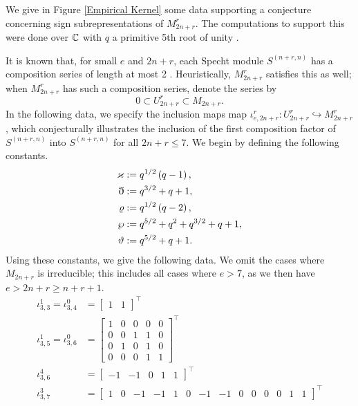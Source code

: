\documentclass{amsart}
\begin{document}
We give in Figure \ref{Empirical Kernel} some data supporting a conjecture concerning sign subrepresentations of $M_{2n + r}^r$.
The computations to support this were done over $\mathbb{C}$ with $q$ a primitive 5th root of unity \cite{Github}.

It is known that, for small $e$ and $2n + r$, each Specht module $S^{(n+r,n)}$ has a composition series of length at most 2 \cite[Appendix B]{Mathas-book}.
Heuristically, $M_{2n + r}^r$ satisfies this as well;
when $M_{2n + r}^r$ has such a composition series, denote the series by
\begin{equation}\label{U composition series}
  0 \subset U_{2n + r}^r \subset M_{2n + r}.
\end{equation}
In the following data, we specify the inclusion maps map $\iota_{e,2n+r}^r:U_{2n + r}^r \hookrightarrow M_{2n + r}^r $, which conjecturally illustrates the inclusion of the first composition factor of $S^{(n+r,n)}$ into $S^{(n+r,n)}$ for all $2n + r \leq 7$.
We begin by defining the following constants.
\def\qqo{\varkappa}
\def\tto{\eth}
\def\vtv{\varrho}
\def\fft{\wp}
\def\fto{\vartheta}
\setcounter{MaxMatrixCols}{20}
\begin{align*}
  \qqo &:= q^{1/2}\prn{q - 1},\\
  \tto &:= q^{3/2} + q + 1,\\
  \vtv &:= q^{1/2}\prn{q - 2},\\
  \fft &:= q^{5/2} + q^2 + q^{3/2} + q + 1,\\ 
  \fto &:= q^{5/2} + q + 1.
\end{align*}
Using these constants, we give the following data.
We omit the cases where $M_{2n + r}$ is irreducible;
this includes all cases where $e > 7$, as we then have $e > 2n + r \geq n + r + 1$.
\begin{align*} 
  \iota_{3,3}^1 = \iota_{3,4}^0 &=  
\begin{bmatrix}
  1 & 1
\end{bmatrix}^\intercal\\
\iota_{3,5}^1 = \iota_{3,6}^0&=  
\begin{bmatrix}
  1 & 0 & 0 & 0 & 0\\
  0 & 0 & 1 & 1 & 0\\
  0 & 1 & 0 & 1 & 0\\
  0 & 0 & 0 & 1 & 1
\end{bmatrix}^\intercal\\
\iota_{3,6}^4&=  
\begin{bmatrix}
  -1 & -1 & 0 & 1 & 1
\end{bmatrix}^\intercal\\
\iota_{3,7}^3&=  
\begin{bmatrix}
 1 & 0 &-1 &-1 & 1 & 0 & -1 & -1 & 0 & 0 & 0 & 0 & 1 & 1
\end{bmatrix}^\intercal
\end{align*}
\end{document}
